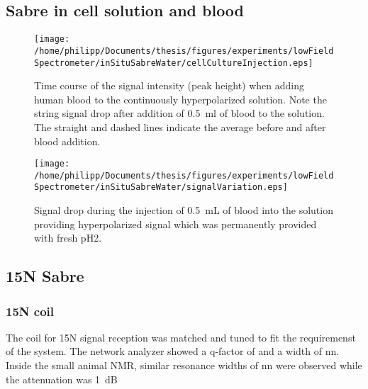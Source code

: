 	\subsection{Sabre in cell solution and blood}
	\begin{figure}[h]
		\texttt{[image: /home/philipp/Documents/thesis/figures/experiments/lowFieldSpectrometer/inSituSabreWater/cellCultureInjection.eps]}
		\caption{Time course of the signal intensity (peak height) when adding human blood to the continuously hyperpolarized solution. Note the string signal drop after addition of \SI{0.5}{\milli\litre} of blood to the solution. The straight and dashed lines indicate the average before and after blood addition.}
		\label{chap:MaterialsAndMethods:bloodInjection}
	\end{figure}
	\begin{figure}[h]
		\texttt{[image: /home/philipp/Documents/thesis/figures/experiments/lowFieldSpectrometer/inSituSabreWater/signalVariation.eps]}
		\label{chap:MaterialsAndMethods:bloodInjection2}
		\caption{Signal drop during the injection of \SI{0.5}{\milli\liter} of blood into the solution providing hyperpolarized signal which was permanently provided with fresh pH2.}
	\end{figure}
	\subsection{15N Sabre}
		\subsubsection{15N coil}
		The coil for 15N signal reception was matched and tuned to fit the requiremenst of the system. The network analyzer showed a q-factor of  and a width of nn. Inside the small animal NMR, similar resonance widths of nn were observed while the attenuation was \SI{1}{\deci\bel}
